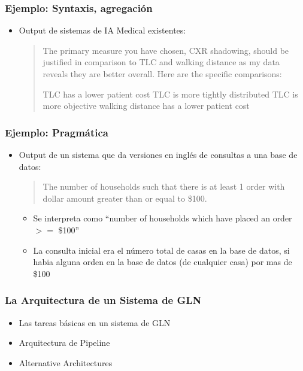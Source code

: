 \documentclass[compress,color=usenames]{beamer}
\begin{document}
\begin{frame}
\frametitle{Ejemplo: Syntaxis, agregaci\'on}

\label{f48}
\begin{itemize}
\item { {Output de sistemas de IA Medical existentes:}}

\begin{quote}
 The primary measure you have chosen, CXR shadowing, should be justified in comparison to TLC and walking distance as my data reveals they are better overall. Here are the specific comparisons:
\medskip

 TLC has a lower patient cost TLC is more tightly distributed TLC is more objective walking distance has a lower patient cost
\end{quote}
\end{itemize}

\end{frame}

\begin{frame}
\frametitle{Ejemplo: Pragm\'atica}

\label{f50}
\begin{itemize}
\item Output de un sistema que da versiones en ingl\'es de consultas a una base de datos:

\begin{quote} 
The number of households such that there is at least 1 order with dollar amount greater 
than or equal to \$100.\pause
\end{quote}

\begin{itemize}

\item Se interpreta como ``number of households which have placed an order 
\mbox{$>=$} \$100'' \pause
\item La consulta inicial era el n\'umero total de casas en la base de datos, si habia alguna 
orden en la base de datos (de cualquier casa) por mas de \$100
\end{itemize}
\end{itemize}

\end{frame}

\begin{frame}
\frametitle{La Arquitectura de un Sistema de GLN}

\begin{itemize}
\item { {Las tareas b\'asicas en un sistema de GLN}}
\item Arquitectura de Pipeline 
\item Alternative Architectures
\end{itemize}

\end{frame}
\end{document}
